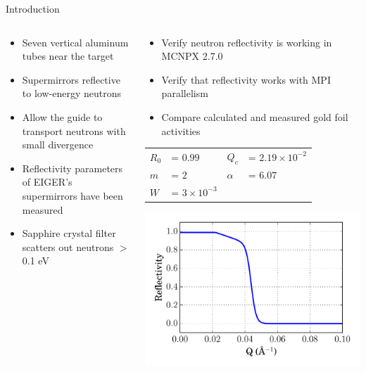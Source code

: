\documentclass[final,t]{beamer}
\begin{document}
\begin{frame}{}
\begin{columns}[t]
\begin{column}{.3\linewidth}
\begin{block}{Introduction}
\begin{columns}
\begin{column}{.5\linewidth}
\begin{itemize}
\item Seven vertical aluminum tubes near the target 
\end{itemize}

  \begin{itemize} 
  \item Supermirrors reflective to low-energy neutrons \cite{mcnpx-ref}
  \item Allow the guide to transport neutrons with small divergence
  \item Reflectivity parameters of EIGER's supermirrors have been measured \cite{eiger-uwe}
  \item Sapphire crystal filter scatters out neutrons $>$0.1 eV \cite{freund}
  \end{itemize}
\end{column}

\begin{column}{.5\linewidth}
  \begin{itemize}
  \item Verify neutron reflectivity is working in MCNPX 2.7.0 \cite{mcnpx-ref,mcnpx270}
  \item Verify that reflectivity works with MPI parallelism
  \item Compare calculated and measured gold foil activities
  \end{itemize}

        \begin{tabular}{l l l l}
        $R_0$    & = $0.99            $ & $ Q_c  $  & = $ 2.19 \times 10^{-2} $\\
        $m  $    & = $2               $ & $\alpha$  & = $ 6.07 $ \\
        $W  $    & = $3 \times 10^{-3}$ & $      $  &   
        \end{tabular}

    \includegraphics*[width=\linewidth]{reflectivity_curve.pdf}


\end{column}
\end{columns}
\end{block}
\end{column}
\end{columns}
\end{frame}
\end{document}
